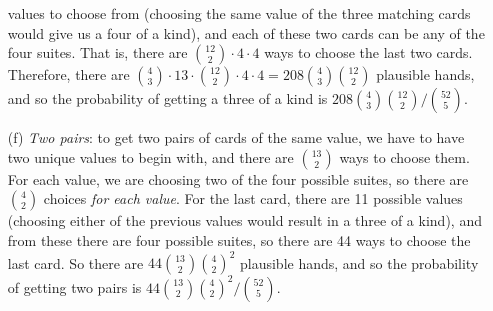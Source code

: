 \documentclass[10pt]{article}
\begin{document}
\begin{itemize}
    values to choose from (choosing the same value of the three matching cards would give us a four of a kind), and each of these two cards can be 
    any of the four suites. That is, there are \(\binom{12}{2}\cdot4\cdot4\) ways to choose the last two cards. Therefore, there are 
    \(\binom{4}{3}\cdot13\cdot\binom{12}{2}\cdot4\cdot4 = 208\binom{4}{3}\binom{12}{2}\) plausible hands, and so the probability of 
    getting a three of a kind is \(208\binom{4}{3}\binom{12}{2} / \binom{52}{5}\).
    \item[(f)] \textsl{Two pairs}: to get two pairs of cards of the same value, we have to have two unique values to begin with, and there are 
    \(\binom{13}{2}\) ways to choose them. For each value, we are choosing two of the four possible suites, so there are \(\binom{4}{2}\) choices 
    \textit{for each value}. For the last card, there are 11 possible values (choosing either of the previous values would result in a three of a kind),
    and from these there are four possible suites, so there are 44 ways to choose the last card. So there are \(44\binom{13}{2}\binom{4}{2}^2\) plausible 
    hands, and so the probability of getting two pairs is \(44\binom{13}{2}\binom{4}{2}^2 / \binom{52}{5}\).
\end{itemize}

\end{document}
